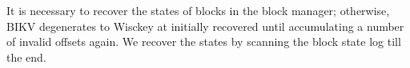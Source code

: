 \documentclass[sigconf]{acmart}
\begin{document}
It is necessary to recover the states of blocks in the block manager; otherwise, BIKV degenerates to Wisckey at initially recovered until accumulating a number of invalid offsets again. We recover the states by scanning the block state log till the end.

\end{document}
